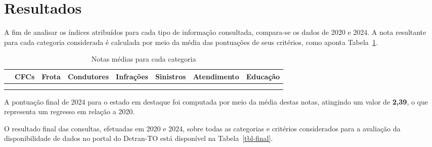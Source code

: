 \documentclass[
  a4paper,
]{article}
\begin{document}
\section{Resultados}\label{sec-resultados}

A fim de analisar os índices atribuídos para cada tipo de informação
consultada, compara-se os dados de 2020 e 2024. A nota resultante para
cada categoria considerada é calculada por meio da média das pontuações
de seus critérios, como aponta Tabela~\ref{tbl-media}.

\begin{longtable}{l|ccccccc}

\caption{\label{tbl-media}Notas médias para cada categoria}

\tabularnewline

\toprule
\multicolumn{1}{l}{} & CFCs & Frota & Condutores & Infrações & Sinistros & Atendimento & Educação \\ 
\midrule\addlinespace[2.5pt]
2024 & \cellcolor[HTML]{F5951E}{\textcolor[HTML]{000000}{$6,7$}} & \cellcolor[HTML]{D7191C}{\textcolor[HTML]{FFFFFF}{$0,0$}} & \cellcolor[HTML]{D7191C}{\textcolor[HTML]{FFFFFF}{$0,0$}} & \cellcolor[HTML]{D7191C}{\textcolor[HTML]{FFFFFF}{$0,0$}} & \cellcolor[HTML]{D7191C}{\textcolor[HTML]{FFFFFF}{$0,0$}} & \cellcolor[HTML]{F47B20}{\textcolor[HTML]{FFFFFF}{$5,0$}} & \cellcolor[HTML]{F47B20}{\textcolor[HTML]{FFFFFF}{$5,0$}} \\ 
\midrule\addlinespace[2.5pt]
2020 & \cellcolor[HTML]{1FA149}{\textcolor[HTML]{FFFFFF}{$10,0$}} & \cellcolor[HTML]{F5841F}{\textcolor[HTML]{FFFFFF}{$5,6$}} & \cellcolor[HTML]{D7191C}{\textcolor[HTML]{FFFFFF}{$0,0$}} & \cellcolor[HTML]{D7191C}{\textcolor[HTML]{FFFFFF}{$0,0$}} & \cellcolor[HTML]{D7191C}{\textcolor[HTML]{FFFFFF}{$0,0$}} & \cellcolor[HTML]{F47B20}{\textcolor[HTML]{FFFFFF}{$5,0$}} & \cellcolor[HTML]{D7191C}{\textcolor[HTML]{FFFFFF}{$0,0$}} \\ 
\bottomrule

\end{longtable}

A pontuação final de 2024 para o estado em destaque foi computada por
meio da média destas notas, atingindo um valor de \textbf{2,39}, o que
representa um regresso em relação a 2020.

O resultado final das consultas, efetuadas em 2020 e 2024, sobre todas
as categorias e critérios considerados para a avaliação da
disponibilidade de dados no portal do Detran-TO está disponível na
Tabela~\ref{tbl-final}.
\end{document}
